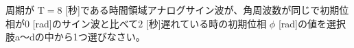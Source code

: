 周期が $\textrm{T}=8$ [秒]である時間領域アナログサイン波が、角周波数が同じで初期位相が$0$ [rad]のサイン波と比べて$2$ [秒]遅れている時の初期位相 $\phi$ [rad]の値を選択肢a〜dの中から1つ選びなさい。
